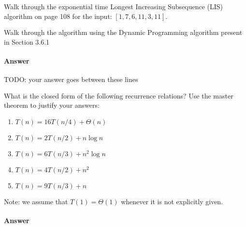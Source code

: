 \documentclass{article}
\begin{document}


\nextprob
{}

Walk through the exponential time Longest Increasing Subsequence (LIS) algorithm
on page 108 for the input: $\left[ 1, 7, 6, 11, 3, 11 \right]$.

Walk through the algorithm using the Dynamic Programming algorithm present in
Section 3.6.1

\paragraph{Answer}


TODO: your answer goes between these lines


\nextprob
{}

What is the closed form of the following recurrence relations?  Use the master
theorem to justify your answers:
\begin{enumerate}
    \item $T(n) = 16 T(n/4) + \Theta(n)$
    \item $T(n) = 2 T(n/2) + n \log{n}$
    \item $T(n) = 6 T(n/3) + n^2 \log{n}$
    \item $T(n) = 4 T(n/2) + n^2$
    \item $T(n) = 9 T(n/3) + n$
\end{enumerate}
Note: we assume that $T(1)=\Theta(1)$ whenever it is not explicitly given.

\paragraph{Answer}

\end{document}
